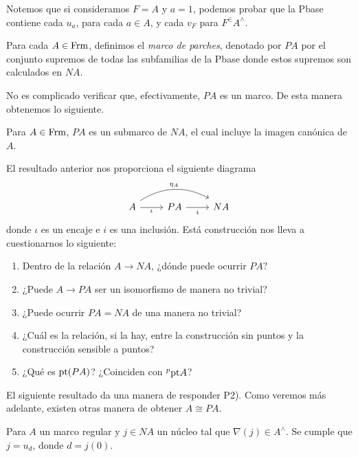 Notemos que si consideramos $F=A$ y $a=1$, podemos probar que la Pbase contiene cada $u_a$, para cada $a\in A$, y cada $v_F$ para $F^\in A^\wedge$.

\begin{dfn}\label{Definicion7.1.2}
    Para cada $A\in \mathrm{Frm}$, definimos el \emph{marco de parches}, denotado por $PA$ por el conjunto supremos de todas las subfamilias de la Pbase donde estos supremos son calculados en $NA$.
\end{dfn}

No es complicado verificar que, efectivamente, $PA$ es un marco. De esta manera obtenemos lo siguiente.

\begin{thm}\label{Teorema7.1.3}
    Para $A\in \mathrm{Frm}$, $PA$ es un submarco de $NA$, el cual incluye la imagen canónica de $A$.
\end{thm}

El resultado anterior nos proporciona el siguiente diagrama
\[
\begin{tikzcd}
A \arrow[r, "\iota"'] \arrow[rr, "\eta_A", bend left, shift left] & PA \arrow[r, "i"'] & NA
\end{tikzcd}
\]
donde $\iota$ es un encaje e $i$ es una inclusión. Está construcción nos lleva a cuestionarnos lo siguiente:
\begin{enumerate}[P1)]
    \item Dentro de la relación $A\to NA$, ¿dónde puede ocurrir $PA?$
    \item ¿Puede $A\to PA$ ser un isomorfismo de manera no trivial?
    \item ¿Puede ocurrir $PA=NA$ de una manera no trivial?
    \item ¿Cuál es la relación, si la hay, entre la construcción sin puntos y la construcción sensible a puntos?

    \item ¿Qué es $\mathrm{pt} (PA)$? ¿Coinciden con $^p\mathrm{pt} A$?
\end{enumerate}

El siguiente resultado da una manera de responder P2). Como veremos más adelante, existen otras manera de obtener $A\cong PA$.

\begin{thm}\label{Teorema7.1.4}
    Para $A$ un marco regular y $j\in NA$ un núcleo tal que $\nabla(j)\in A^\wedge$. Se cumple que $j=u_d$, donde $d=j(0)$. 
\end{thm}


